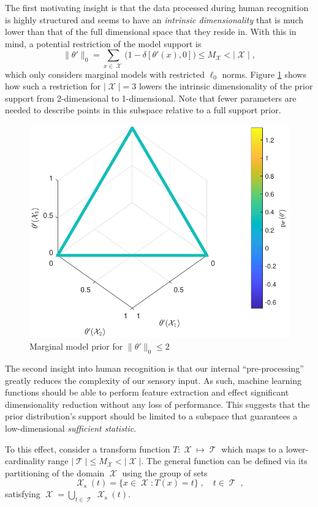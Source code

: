 \documentclass[12pt]{report}
\DeclareMathOperator{\srm}{\mathrm{s}}
\DeclareMathOperator{\Xcal}{\mathcal{X}}
\DeclareMathOperator{\Tcal}{\mathcal{T}}
\begin{document}
The first motivating insight is that the data processed during human recognition is highly structured and seems to have an \emph{intrinsic dimensionality} that is much lower than that of the full dimensional space that they reside in. With this in mind, a potential restriction of the model support is
\begin{equation}
\big\| \theta' \big\|_0 = \sum_{x \in \Xcal} \Big(1 - \delta[\theta'(x),0] \Big) \leq M_{\Xcal} < |\Xcal| \;,
\end{equation}
which only considers marginal models with restricted $\ell_0$ norms. Figure \ref{fig:P_theta_limited_obs} shows how such a restriction for $|\Xcal| = 3$ lowers the intrinsic dimensionality of the prior support from 2-dimensional to 1-dimensional. Note that fewer parameters are needed to describe points in this subspace relative to a full support prior.
\begin{figure}
\centering
\includegraphics[width=0.6\linewidth]{P_theta_limited_obs.pdf}
\caption{Marginal model prior for $\big\| \theta' \big\|_0 \leq 2$}
\label{fig:P_theta_limited_obs}
\end{figure}

The second insight into human recognition is that our internal ``pre-processing'' greatly reduces the complexity of our sensory input. As such, machine learning functions should be able to perform feature extraction and effect significant dimensionality reduction without any loss of performance. This suggests that the prior distribution's support should be limited to a subspace that guarantees a low-dimensional \emph{sufficient statistic}.

To this effect, consider a transform function $T: \Xcal \mapsto \Tcal$ which maps to a lower-cardinality range $|\Tcal| \leq M_{\Xcal} < |\Xcal|$. The general function can be defined via its partitioning of the domain $\Xcal$ using the group of sets 
\begin{equation}
\Xcal_{\srm}(t) = \big\{ x \in \Xcal : T(x) = t \big\} \;, \quad t \in \Tcal \;,
\end{equation}
satisfying $\Xcal = \bigcup_{t \in \Tcal} \Xcal_{\srm}(t)$. 
\end{document}
